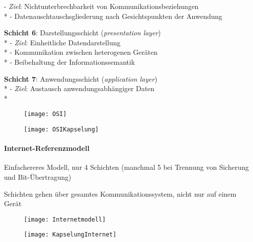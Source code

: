\begin{items}
    - \emph{Ziel}: Nichtunterbrechbarkeit von Kommunikationsbeziehungen \\*
    - Datenauschtauschsgliederung nach Gesichtspunkten der Anwendung
  \item \textbf{Schicht 6}: Darstellungsschicht (\emph{presentation layer}) \\*
    - \emph{Ziel}: Einheitliche Datendarstellung \\*
    - Kommunikation zwischen heterogenen Geräten \\*
    - Beibehaltung der Informationssemantik
  \item \textbf{Schicht 7}: Anwendungsschicht (\emph{application layer}) \\*
    - \emph{Ziel}: Austausch anwendungsabhängiger Daten \\*
\end{items}
\begin{figure}[H]\centering\label{OSI}\texttt{[image: OSI]}\end{figure}
\begin{figure}[H]\centering\label{OSIKapselung}\texttt{[image: OSIKapselung]}\end{figure}

\newpage

\paragraph{Internet-Referenzmodell}
\begin{items}
  \item Einfachereres Modell, nur 4 Schichten (manchmal 5 bei Trennung von Sicherung und Bit-Übertragung)
  \item Schichten gehen über gesamtes Kommunikationssystem, nicht nur auf einem Gerät
\end{items}
\begin{figure}[H]\centering\label{Internetmodell}\texttt{[image: Internetmodell]}\end{figure}
\begin{figure}[H]\centering\label{KapselungInternet}\texttt{[image: KapselungInternet]}\end{figure}

